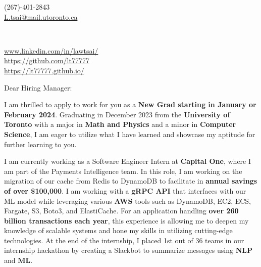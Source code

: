 \documentclass[10.5pt,a4]{article}
\begin{document}
\begin{center}
    \begin{minipage}[b]{0.24\textwidth}
            \large (267)-401-2843 \\
            \large \href{mailto:L.tsai@mail.utoronto.ca}{L.tsai@mail.utoronto.ca} 
    \end{minipage}%
    \begin{minipage}[b]{0.5\textwidth}
             \\ %
            \vspace{0.1cm}
            {\color{UI_blue} \Large{}}
    \end{minipage}%
    \begin{minipage}[b]{0.33\textwidth}
            \flushright \small
            {\href{www.linkedin.com/in/lawtsai/}{www.linkedin.com/in/lawtsai/} } \\
            \href{https://github.com/lt77777}{https://github.com/lt77777} \\
            \href{https://lt77777.github.io/}
            {https://lt77777.github.io/}
    \end{minipage}   
    
\vspace{-0.15cm} 
{\color{UI_blue} \hrulefill}
\end{center}

\justify
\setlength{\parindent}{0pt}
\setlength{\parskip}{12pt}
\vspace{0.2cm}




Dear Hiring Manager:

I am thrilled to apply to work for you as a \textbf{New Grad starting in January or February 2024}. Graduating in December 2023 from the \textbf{University of Toronto} with a major in \textbf{Math and Physics} and a minor in \textbf{Computer Science}, I am eager to utilize what I have learned and showcase my aptitude for further learning to you.

I am currently working as a Software Engineer Intern at \textbf{Capital One}, where I am part of the Payments Intelligence team. In this role, I am working on the migration of our cache from Redis to DynamoDB to facilitate in \textbf{annual savings of over \$100,000}. I am working with a \textbf{gRPC API} that interfaces with our ML model while leveraging various \textbf{AWS} tools such as DynamoDB, EC2, ECS, Fargate, S3, Boto3, and ElastiCache. For an application handling \textbf{over 260 billion transactions each year}, this experience is allowing me to deepen my knowledge of scalable systems and hone my skills in utilizing cutting-edge technologies. At the end of the internship, I placed 1st out of 36 teams in our internship hackathon 
by creating a Slackbot to summarize messages using \textbf{NLP} and \textbf{ML}.
\end{document}
